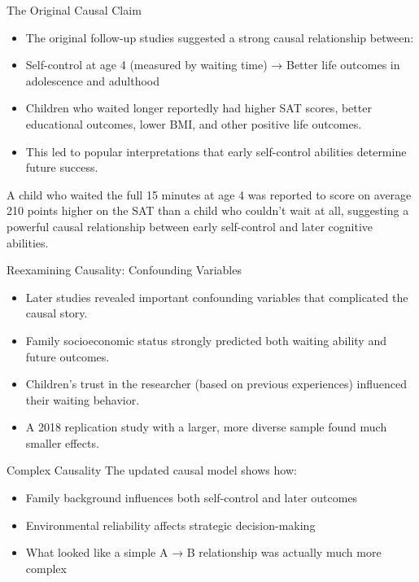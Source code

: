 \documentclass{beamer}
\begin{document}
\begin{frame}{The Original Causal Claim}
    \begin{itemize}
        \item The original follow-up studies suggested a strong causal relationship between:
        \item Self-control at age 4 (measured by waiting time) → Better life outcomes in adolescence and adulthood
        \item Children who waited longer reportedly had higher SAT scores, better educational outcomes, lower BMI, and other positive life outcomes.
        \item This led to popular interpretations that early self-control abilities determine future success.
    \end{itemize}
    
    \begin{example}
        A child who waited the full 15 minutes at age 4 was reported to score on average 210 points higher on the SAT than a child who couldn't wait at all, suggesting a powerful causal relationship between early self-control and later cognitive abilities.
    \end{example}
\end{frame}

\begin{frame}{Reexamining Causality: Confounding Variables}
    \begin{itemize}
        \item Later studies revealed important confounding variables that complicated the causal story.
        \item Family socioeconomic status strongly predicted both waiting ability and future outcomes.
        \item Children's trust in the researcher (based on previous experiences) influenced their waiting behavior.
        \item A 2018 replication study with a larger, more diverse sample found much smaller effects.
    \end{itemize}
    
    \begin{alertblock}{Complex Causality}
        The updated causal model shows how:
        \begin{itemize}
            \item Family background influences both self-control and later outcomes
            \item Environmental reliability affects strategic decision-making
            \item What looked like a simple A → B relationship was actually much more complex
        \end{itemize}
    \end{alertblock}
\end{frame}
\end{document}
